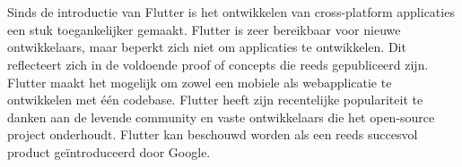 
\chapter{}
\label{ch:inleiding}

Sinds de introductie van Flutter is het ontwikkelen van cross-platform applicaties een stuk toegankelijker gemaakt. Flutter is zeer bereikbaar voor nieuwe ontwikkelaars, maar beperkt zich niet om applicaties te ontwikkelen. Dit reflecteert zich in de voldoende proof of concepts die reeds gepubliceerd zijn. Flutter maakt het mogelijk om zowel een mobiele als webapplicatie te ontwikkelen met één codebase. Flutter heeft zijn recentelijke populariteit te danken aan de levende community en vaste ontwikkelaars die het open-source project onderhoudt. Flutter kan beschouwd worden als een reeds succesvol product geïntroduceerd door Google.
\newline



\section{}
\label{sec:probleemstelling}

